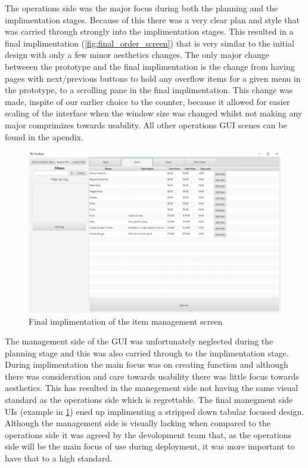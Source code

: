 The operations side was the major focus during both the planning and the implimentation stages. Because of this there was a very clear plan and style that was carried through strongly into the implimentation stages. This resulted in a final implimentation (\ref{fig:final_order_screen}) that is very similar to the initial design with only a few minor aesthetics changes. The only major change betweeen the prototype and the final implimentation is the change from having pages with next/previous buttons to hold any overflow items for a given menu in the prototype, to a scrolling pane in the final implimentation. This change was made, inspite of our earlier choice to the counter, because it allowed for easier scaling of the interface when the window size was changed whilst not making any major comprimizes towards usability.
All other operations GUI scenes can be found in the apendix.

\begin{figure}[ht]
	\centering
	\includegraphics[width=150mm]{images/Final_GUI/item_screen.png}
	\caption{Final implimentation of the item management screen}
	\label{fig:final_item_screen}
\end{figure}

The management side of the GUI was unfortunately neglected during the planning stage and this was also carried through to the implimentation stage. During implimentation the main focus was on creating function and although there was consideration and care towards usability there was little focus towards aesthetics. This has resulted in the manegement side not having the same visual standard as the operations side which is regrettable. The final manegment side UIs (example in \ref{fig:final_item_screen}) ened up implimenting a stripped down tabular focused design. Although the management side is visually lacking when compared to the operations side it was agreed by the devolopment team that, as the operations side will be the main focus of use during deployment, it was more important to have that to a high standard.

